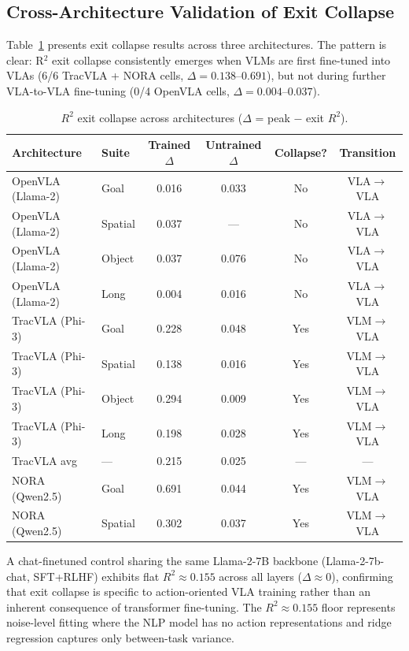 \documentclass[10pt,letterpaper]{article}
\begin{document}
\subsection{Cross-Architecture Validation of Exit Collapse}

Table~\ref{tab:cross_arch_r2} presents exit collapse results across three architectures. The pattern is clear: R$^2$ exit collapse consistently emerges when VLMs are first fine-tuned into VLAs (6/6 TracVLA + NORA cells, $\Delta = 0.138$--$0.691$), but not during further VLA-to-VLA fine-tuning (0/4 OpenVLA cells, $\Delta = 0.004$--$0.037$).

\begin{table}[h]
\centering
\caption{$R^2$ exit collapse across architectures ($\Delta$ = peak $-$ exit $R^2$).}
\label{tab:cross_arch_r2}
\small
\begin{tabular}{llcccc}
\toprule
Architecture & Suite & Trained $\Delta$ & Untrained $\Delta$ & Collapse? & Transition \\
\midrule
OpenVLA (Llama-2) & Goal & 0.016 & 0.033 & No & VLA$\to$VLA \\
OpenVLA (Llama-2) & Spatial & 0.037 & --- & No & VLA$\to$VLA \\
OpenVLA (Llama-2) & Object & 0.037 & 0.076 & No & VLA$\to$VLA \\
OpenVLA (Llama-2) & Long & 0.004 & 0.016 & No & VLA$\to$VLA \\
\midrule
TracVLA (Phi-3) & Goal & 0.228 & 0.048 & Yes & VLM$\to$VLA \\
TracVLA (Phi-3) & Spatial & 0.138 & 0.016 & Yes & VLM$\to$VLA \\
TracVLA (Phi-3) & Object & 0.294 & 0.009 & Yes & VLM$\to$VLA \\
TracVLA (Phi-3) & Long & 0.198 & 0.028 & Yes & VLM$\to$VLA \\
TracVLA avg & --- & 0.215 & 0.025 & --- & --- \\
\midrule
NORA (Qwen2.5) & Goal & 0.691 & 0.044 & Yes & VLM$\to$VLA \\
NORA (Qwen2.5) & Spatial & 0.302 & 0.037 & Yes & VLM$\to$VLA \\
\bottomrule
\end{tabular}
\end{table}

A chat-finetuned control sharing the same Llama-2-7B backbone (Llama-2-7b-chat, SFT+RLHF) exhibits flat $R^2 \approx 0.155$ across all layers ($\Delta \approx 0$), confirming that exit collapse is specific to action-oriented VLA training rather than an inherent consequence of transformer fine-tuning. The $R^2 \approx 0.155$ floor represents noise-level fitting where the NLP model has no action representations and ridge regression captures only between-task variance.
\end{document}
